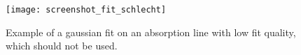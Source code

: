 \begin{figure}[H]
	\centering
	\texttt{[image: screenshot\_fit\_schlecht]}
	\caption{Example of a gaussian fit on an absorption line with low fit quality, which should not be used.}
	\label{fit_schlecht}
\end{figure}




